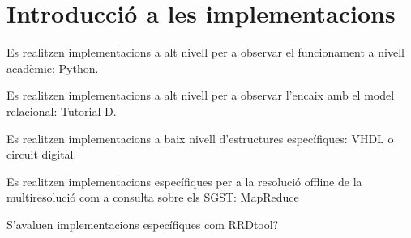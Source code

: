 

\chapter{Introducció a les implementacions}


Es realitzen implementacions a alt nivell per a observar el funcionament a nivell acadèmic: Python.

Es realitzen implementacions a alt nivell per a observar l'encaix amb el model relacional: Tutorial D.

Es realitzen implementacions a baix nivell d'estructures específiques: VHDL o circuit digital.


Es realitzen implementacions específiques per a la resolució offline de la multiresolució com a consulta sobre els SGST: MapReduce


S'avaluen implementacions específiques com RRDtool?





















